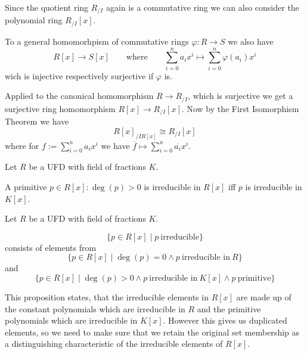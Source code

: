 Since the quotient ring \(R_{/I}\) again is a commutative ring we can also consider the polynomial ring \(R_{/I}[x]\).

To a general homomorhpism of commutative rings \(\varphi: R \to S\) we also have
\[R[x] \to S[x] \qquad\text{where}\qquad \sum_{i=0}^n a_i x^i \mapsto \sum_{i=0}^n \varphi(a_i) x^i\]
wich is injective respectively surjective if \(\varphi\) is.

Applied to the canonical homomorphism \(R \to R_{/I}\), which is surjective we get a surjective ring homomorphism \(R[x] \to R_{/I}[x]\).
Now by the First Isomorphism Theorem we have
\[R[x]_{/IR[x]} \cong R_{/I}[x]\]
where for \(f := \sum_{i=0}^n a_i x^i\) we have \(\overline{f} \mapsto \sum_{i=0}^n \overline{a_i}x^i\).

\begin{proposition}
   Let \(R\) be a UFD with field of fractions \(K\).

   A primitive \(p \in R[x]: \deg(p) > 0\) is irreducible in \(R[x]\) iff \(p\) is irreducible in \(K[x]\).
\end{proposition}

\begin{proposition}
   Let \(R\) be a UFD with field of fractions \(K\).

   \[\{p \in R[x] \mid p~\text{irreducible}\}\]
   consists of elements from
   \[\{p \in R[x] \mid \deg(p) = 0 \land p~\text{irreducible in}~R\}\]
   and
   \[\{p \in R[x] \mid \deg(p) > 0 \land p~\text{irreducible in}~K[x] \land p~\text{primitive}\}\]
\end{proposition}
\begin{remark}
   This proposition states, that the irreducible elements in \(R[x]\) are made up of the constant polynomials which are irreducible in \(R\) and the primitive polynomials which are irreducible in \(K[x]\).
   However this gives us duplicated elements, so we need to make sure that we retain the original set membership as a distinguishing characteristic of the irreducible elements of \(R[x]\).
\end{remark}

